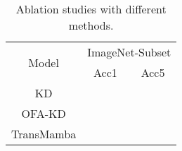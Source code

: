 
\begin{table}[]
\centering
\scalebox{0.9}
{
\begin{tabular}{c|cc}
\midrule
\multirow{2}{*}{Model} & \multicolumn{2}{c}{ImageNet-Subset} \\
                       & \multicolumn{1}{c|}{Acc1}   & Acc5  \\ \midrule
KD          &                             &       \\
OFA-KD                 &                             &       \\
TransMamba                 &                             &       \\
\midrule
\end{tabular}}
\caption{
Ablation studies with different methods.
}
\label{tab:aba_teacher}
\end{table}